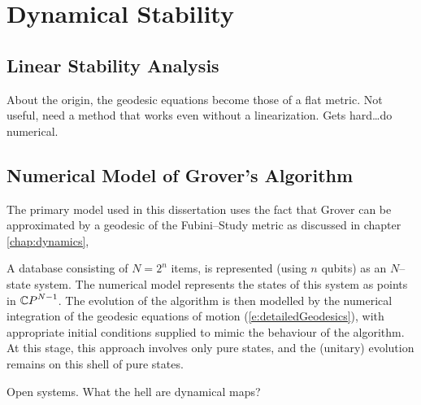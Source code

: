 
\chapter{Dynamical Stability}
\label{chap:dynamicalStability}
%



\section{Linear Stability Analysis}

About the origin, the geodesic equations become those of a flat metric.
Not useful, need a method that works even without a linearization.
Gets hard\dots do numerical.


\section{Numerical Model of Grover's Algorithm}

The primary model used in this dissertation uses the fact
that Grover can be approximated by a geodesic of the
Fubini--Study metric as discussed in chapter \ref{chap:dynamics},

A database consisting of $N=2^n$ items, is represented (using
$n$ qubits) as an $N$--state system.
The numerical model represents the states of this system as points 
in ${\mathbb{C} P}^{N-1}$.  The evolution of the algorithm is then modelled by the
numerical integration of the geodesic equations of motion
(\ref{e:detailedGeodesics}), with 
appropriate initial conditions supplied to mimic the behaviour of 
the algorithm.  At this stage, this approach involves only pure 
states, and the (unitary) evolution remains on this shell of pure 
states.


Open systems.
What the hell are dynamical maps?

